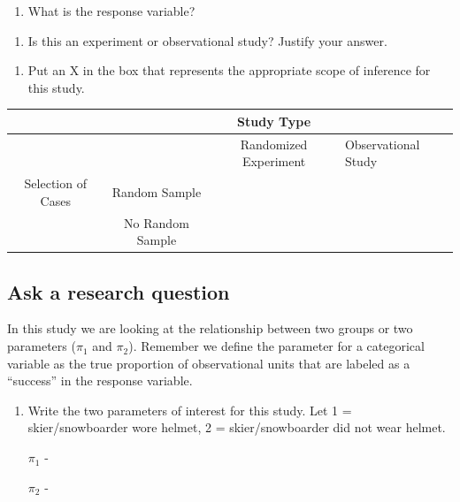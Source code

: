 \documentclass[
]{report}
\providecommand{\tightlist}{%
  \setlength{\itemsep}{0pt}\setlength{\parskip}{0pt}}
\begin{document}
\vspace{0.3in}

\begin{enumerate}
\def\labelenumi{\arabic{enumi}.}
\setcounter{enumi}{1}
\tightlist
\item
  What is the response variable?
\end{enumerate}

\vspace{0.3in}

\begin{enumerate}
\def\labelenumi{\arabic{enumi}.}
\setcounter{enumi}{2}
\tightlist
\item
  Is this an experiment or observational study? Justify your answer.
\end{enumerate}

\newpage

\begin{enumerate}
\def\labelenumi{\arabic{enumi}.}
\setcounter{enumi}{3}
\tightlist
\item
  Put an X in the box that represents the appropriate scope of inference for this study.
\end{enumerate}

\begin{longtable}[]{@{}cccl@{}}
\toprule
& & Study Type &\tabularnewline
\midrule
\endhead
& & Randomized Experiment & Observational Study\tabularnewline
Selection of Cases & Random Sample & &\tabularnewline
& No Random Sample & &\tabularnewline
\bottomrule
\end{longtable}

\hypertarget{ask-a-research-question}{%
\subsection*{Ask a research question}\label{ask-a-research-question}}

In this study we are looking at the relationship between two groups or two parameters (\(\pi_1\) and \(\pi_2\)). Remember we define the parameter for a categorical variable as the true proportion of observational units that are labeled as a ``success'' in the response variable.

\begin{enumerate}
\def\labelenumi{\arabic{enumi}.}
\setcounter{enumi}{4}
\item
  Write the two parameters of interest for this study. Let 1 = skier/snowboarder wore helmet, 2 = skier/snowboarder did not wear helmet.
  \vspace{1mm}

  \(\pi_1\) -
  \vspace{0.5in}

  \(\pi_2\) -
  \vspace{0.5in}
\end{enumerate}
\end{document}
